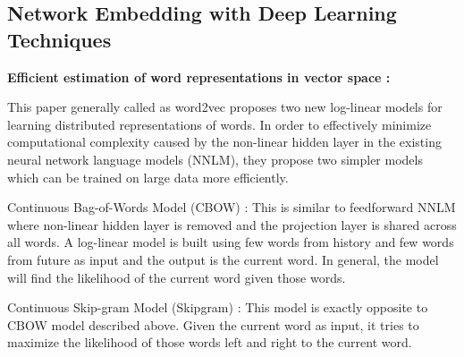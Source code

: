 \subsection{\textbf{Network Embedding with Deep Learning Techniques}}
\begin{flushleft}
\textbf{Efficient estimation of word representations in vector space \cite{word2vec} : }
\end{flushleft}

This paper generally called as word2vec proposes two new log-linear models for learning distributed representations of words. In order to effectively minimize computational complexity caused by the non-linear hidden layer in the existing neural network language models (NNLM), they propose two simpler models which can be trained on large data more efficiently.

Continuous Bag-of-Words Model (CBOW) : This is similar to feedforward NNLM where non-linear hidden layer is removed and the projection layer is shared across all words. A log-linear model is built using few words from history and few words from future as input and the output is the current word. In general, the model will find the likelihood of the current word given those words.

Continuous Skip-gram Model (Skipgram) : This model is exactly opposite to CBOW model described above. Given the current word as input, it tries to maximize the likelihood of those words left and right to the current word. 

